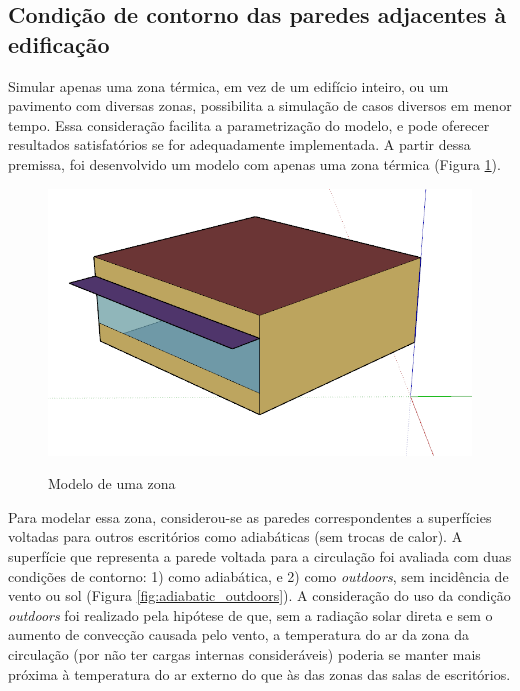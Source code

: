 \documentclass[brazil,hardcopy,openany]{ufscthesis} %
\newcommand{\figsize}{.6}
\begin{document}
\subsection*{Condição de contorno das paredes adjacentes à edificação}

Simular apenas uma zona térmica, em vez de um edifício inteiro, ou um pavimento com diversas zonas, possibilita a simulação de casos diversos em menor tempo.
Essa consideração facilita a parametrização do modelo, e pode oferecer resultados satisfatórios se for adequadamente implementada.
A partir dessa premissa, foi desenvolvido um modelo com apenas uma zona térmica (Figura \ref{fig:singlezone}).

\begin{figure}[h]
	\centering
	\caption{Modelo de uma zona}
	\includegraphics[width=\figsize\linewidth]{img/model.PNG}
	\label{fig:singlezone}
\end{figure}

Para modelar essa zona, considerou-se as paredes correspondentes a superfícies voltadas para outros escritórios como adiabáticas (sem trocas de calor). A superfície que representa a parede voltada para a circulação foi avaliada com duas condições de contorno: 1) como adiabática, e 2) como \textit{outdoors}, sem incidência de vento ou sol (Figura \ref{fig:adiabatic_outdoors}).	
A consideração do uso da condição \textit{outdoors} foi realizado pela hipótese de que, sem a radiação solar direta e sem o aumento de convecção causada pelo vento, a temperatura do ar da zona da circulação (por não ter cargas internas consideráveis) poderia se manter mais próxima à temperatura do ar externo do que às das zonas das salas de escritórios.
\end{document}

